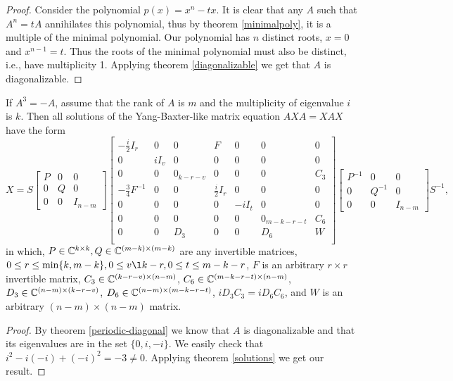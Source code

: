 \documentclass{article}
\begin{document}
\begin{proof}
  Consider the polynomial $p(x) = x^n - t x$.
  It is clear that any $A$ such that $A^n = t A$ annihilates this polynomial, thus by theorem \ref{minimalpoly}, it is a multiple of the minimal polynomial.
  Our polynomial has $n$ distinct roots, $x = 0$ and $x^{n - 1} = t$.
  Thus the roots of the minimal polynomial must also be distinct, i.e., have multiplicity 1.
  Applying theorem \ref{diagonalizable} we get that $A$ is diagonalizable.
\end{proof}

\begin{theorem}
  If $A^3 = -A$, assume that the rank of $A$ is $m$ and the multiplicity of eigenvalue $i$ is $k$.
  Then all solutions of the Yang-Baxter-like matrix equation $A X A = X A X$ have the form
  \[X = S \begin{bmatrix} P & 0 & 0\\ 0 & Q & 0\\ 0 & 0 & I_{n - m} \end{bmatrix} \left[ \begin{array}{ccc|ccc|c} - \frac{i}{2} I_r & 0 & 0 & F & 0 & 0 & 0 \\ 0 & i I_v & 0 & 0 & 0 & 0 & 0 \\ 0 & 0 & 0_{k - r - v} & 0 & 0 & 0 & C_3 \\ \hline - \frac{3}{4} F^{-1} & 0 & 0 & \frac{i}{2} I_r & 0 & 0 & 0 \\ 0 & 0 & 0 & 0 & - i I_t & 0 & 0 \\ 0 & 0 & 0 & 0 & 0 & 0_{m - k - r - t} & C_6 \\ \hline 0 & 0 & D_3 & 0 & 0 & D_6 & W \\ \end{array} \right] \begin{bmatrix} P^{-1} & 0 & 0\\ 0 & Q^{-1} & 0\\ 0 & 0 & I_{n - m} \end{bmatrix} S^{-1},\]
  in which, $P \in \mathbb{C}^{k \times k}, Q \in \mathbb{C}^{(m - k) \times (m - k)}$ are any invertible matrices, $0 \le r \le \min \{k, m - k\}, 0 \le v \l k - r, 0 \le t \le m - k - r$, $F$ is an arbitrary $r \times r$ invertible matrix, $C_3 \in \mathbb{C}^{(k - r - v) \times (n - m)}$, $C_6 \in \mathbb{C}^{(m - k - r - t) \times (n - m)}$, $D_3 \in \mathbb{C}^{(n - m) \times (k - r - v)}$, $D_6 \in \mathbb{C}^{(n - m) \times (m - k - r - t)}$, $i D_3 C_3 = i D_6 C_6$, and $W$ is an arbitrary $(n - m) \times (n - m)$ matrix.
\end{theorem}

\begin{proof}
  By theorem \ref{periodic-diagonal} we know that $A$ is diagonalizable and that its eigenvalues are in the set $\{0, i, - i\}$.
  We easily check that $i^2 - i (- i) + (- i)^2 = -3 \neq 0$.
  Applying theorem \ref{solutions} we get our result.
\end{proof}
\end{document}
